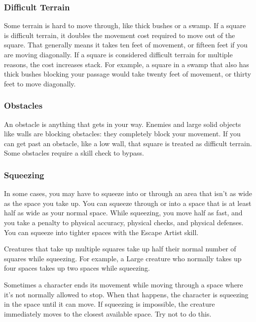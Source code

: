         \subsubsection{Difficult Terrain}\label{Difficult Terrain}
            Some terrain is hard to move through, like thick bushes or a swamp. If a square is difficult terrain, it doubles the movement cost required to move out of the square. That generally means it takes ten feet of movement, or fifteen feet if you are moving diagonally. If a square is considered difficult terrain for multiple reasons, the cost increases stack. For example, a square in a swamp that also has thick bushes blocking your passage would take twenty feet of movement, or thirty feet to move diagonally.

        \subsubsection{Obstacles}
            An obstacle is anything that gets in your way. Enemies and large solid objects like walls are blocking obstacles: they completely block your movement. If you can get past an obstacle, like a low wall, that square is treated as difficult terrain. Some obstacles require a skill check to bypass.

        \subsubsection{Squeezing}\label{Squeezing}

            In some cases, you may have to squeeze into or through an area that isn't as wide as the space you take up. You can squeeze through or into a space that is at least half as wide as your normal space. While squeezing, you move half as fast, and you take a  penalty to physical accuracy, physical checks, and physical defenses. You can squeeze into tighter spaces with the Escape Artist skill.

            Creatures that take up multiple squares take up half their normal number of squares while squeezing. For example, a Large creature who normally takes up four spaces takes up two spaces while squeezing.

             Sometimes a character ends its movement while moving through a space where it's not normally allowed to stop. When that happens, the character is squeezing in the space until it can move. If squeezing is impossible, the creature immediately moves to the closest available space. Try not to do this.

